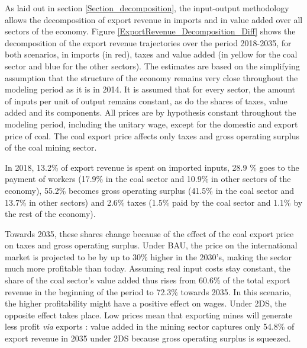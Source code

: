\documentclass[12pt,english]{article}
\begin{document}
As laid out in section \ref{Section_decomposition}, the input-output methodology allows the decomposition of export revenue in imports and in value added over all sectors of the economy. Figure \ref{ExportRevenue_Decomposition_Diff} shows the decomposition of the export revenue trajectories over the period 2018-2035, for both scenarios, in imports (in red), taxes and value added (in yellow for the coal sector and blue for the other sectors). The estimates are based on the simplifying assumption that the structure of the economy remains very close throughout the modeling period as it is in 2014. It is assumed that for every sector, the amount of inputs per unit of output remains constant, as do the shares of taxes, value added and its components. All prices are by hypothesis constant throughout the modeling period, including the unitary wage, except for the domestic and export price of coal. The coal export price affects only taxes and gross operating surplus of the coal mining sector.%

In 2018, 13.2\% of export revenue is spent on imported inputs, 28.9 \% goes to the payment of workers (17.9\% in the coal sector and 10.9\% in other sectors of the economy), 55.2\% becomes gross operating surplus (41.5\% in the coal sector and 13.7\% in other sectors) and 2.6\% taxes (1.5\% paid by the coal sector and 1.1\% by the rest of the economy). %

Towards 2035, these shares change because of the effect of the coal export price on taxes and gross operating surplus. Under BAU, %
the price on the international market is projected to be by up to 30\% higher in the 2030's, making the sector much more profitable than today. Assuming real input costs stay constant, the share of the coal sector's value added thus rises from 60.6\% of the total export revenue in the beginning of the period to 72.3\% towards 2035. In this scenario, the higher profitability might have a positive effect on wages. Under 2DS, the opposite effect takes place. %
Low prices mean that exporting mines will generate less profit \textit{via} exports : value added in the mining sector captures only 54.8\% of export revenue in 2035 under 2DS because gross operating surplus is squeezed.
\end{document}
